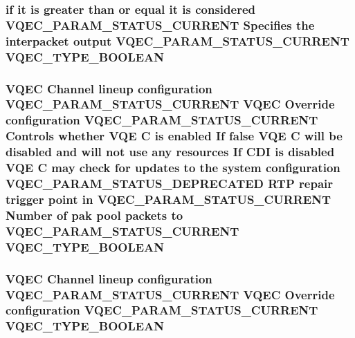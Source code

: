 \subsubsection{\setlength{\rightskip}{0pt plus 5cm}if it is greater than or equal it is considered VQEC\_\-PARAM\_\-STATUS\_\-CURRENT Specifies the interpacket output VQEC\_\-PARAM\_\-STATUS\_\-CURRENT \bf{VQEC\_\-TYPE\_\-BOOLEAN}}\label{vqec__cfg__settings_8h_03927f758bb871048a3cbad7bb7cfce4}


\subsubsection{\setlength{\rightskip}{0pt plus 5cm}VQEC Channel lineup configuration VQEC\_\-PARAM\_\-STATUS\_\-CURRENT VQEC Override configuration VQEC\_\-PARAM\_\-STATUS\_\-CURRENT Controls whether VQE \bf{C} is enabled If false VQE \bf{C} will be disabled and will not use any resources If CDI is disabled VQE \bf{C} may check for updates \bf{to} the system configuration VQEC\_\-PARAM\_\-STATUS\_\-DEPRECATED RTP repair trigger point in VQEC\_\-PARAM\_\-STATUS\_\-CURRENT Number of pak pool packets \bf{to} VQEC\_\-PARAM\_\-STATUS\_\-CURRENT \bf{VQEC\_\-TYPE\_\-BOOLEAN}}\label{vqec__cfg__settings_8h_65f349dfd4585e5ce39a6de8bc71baf6}


\subsubsection{\setlength{\rightskip}{0pt plus 5cm}VQEC Channel lineup configuration VQEC\_\-PARAM\_\-STATUS\_\-CURRENT VQEC Override configuration VQEC\_\-PARAM\_\-STATUS\_\-CURRENT \bf{VQEC\_\-TYPE\_\-BOOLEAN}}\label{vqec__cfg__settings_8h_05ac76be324e5c85ddb7d47474e4d219}


